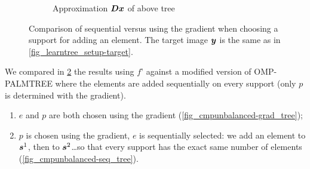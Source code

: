 \begin{figure}[!ht]
\begin{subfigure}[b]{0.49\textwidth}
	\caption{Approximation $\bm{D}\bm{x}$ of above tree}\label{fig_cmpunbalanced-seq_approx}
\end{subfigure}
\caption{Comparison of sequential versus using the gradient when choosing a support for adding an element. The target image $\bm{y}$ is the same as in \cref{fig_learntree_setup-target}.}\label{fig_cmpunbalanced-seq_vs_grad}
\end{figure}

\FloatBarrier
\noindent
We compared in \cref{fig_cmpunbalanced-seq_vs_grad} the results using $f’$ against a modified version of OMP-PALMTREE where the elements are added sequentially on every support (only $p$ is determined with the gradient).
\begin{enumerate}[label=(\alph*)]
	\item $e$ and $p$ are both chosen using the gradient (\cref{fig_cmpunbalanced-grad_tree});
	\item $p$ is chosen using the gradient, $e$ is sequentially selected: we add an element to $\bm{s}^1$, then to $\bm{s}^2$\dots so that every support has the exact same number of elements (\cref{fig_cmpunbalanced-seq_tree}).
\end{enumerate}


